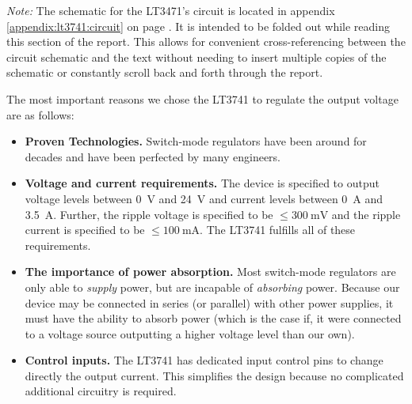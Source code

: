\emph{Note:} The schematic  for the  LT3471's circuit  is located  in appendix
\ref{appendix:lt3741:circuit} on page \pageref{appendix:lt3741:circuit}. It is
intended  to be  folded out  while reading  this section  of the  report. This
allows for convenient cross-referencing between  the circuit schematic and the
text without needing to insert multiple  copies of the schematic or constantly
scroll back and forth through the report.

The most important reasons we chose  the LT3741 to regulate the output voltage
are as follows:

\begin{itemize}
    \item \textbf{Proven Technologies.}
        Switch-mode  regulators have  been around  for decades  and have  been
        perfected by many engineers.
    \item \textbf{Voltage and current requirements.}
        The device is specified to output voltage levels between \SI{0}{\volt}
        and  \SI{24}{\volt} and  current  levels  between \SI{0}{\ampere}  and
        \SI{3.5}{\ampere}.   Further, the  ripple voltage  is specified  to be
        $\le\SI{300}{\milli\volt}$  and the  ripple  current  is specified  to
        be  $\le\SI{100}{\milli\ampere}$. The  LT3741  fulfills all  of  these
        requirements.
    \item \textbf{The importance of power absorption.}
        Most switch-mode regulators are only  able to \emph{supply} power, but
        are  incapable of  \emph{absorbing} power. Because  our device  may be
        connected in series  (or parallel) with other power  supplies, it must
        have  the ability  to absorb  power  (which is  the case  if, it  were
        connected to a  voltage source outputting a higher  voltage level than
        our own).
    \item \textbf{Control inputs.}
        The LT3741  has dedicated  input control pins  to change  directly the
        output  current. This simplifies  the  design  because no  complicated
        additional circuitry is required.
\end{itemize}


